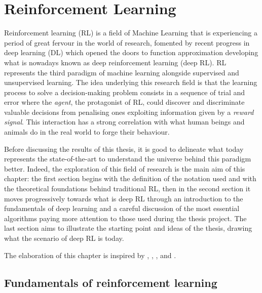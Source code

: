 
\setcounter{chapter}{1}
\chapter{Reinforcement Learning}

Reinforcement learning (RL) is a field of Machine Learning that is experiencing a period of great fervour in the world of research, fomented by recent progress in deep learning (DL) which opened the doors to function approximation developing what is nowadays known as deep reinforcement learning (deep RL).
RL represents the third paradigm of machine learning alongside supervised and unsupervised learning. The idea underlying this research field is that the learning process to solve a decision-making problem consists in a sequence of trial and error where the \textit{agent}, the protagonist of RL, could discover and discriminate valuable decisions from penalising ones exploiting information given by a \textit{reward signal}. This interaction has a strong correlation with what human beings and animals do in the real world to forge their behaviour.


Before discussing the results of this thesis, it is good to delineate what today represents the state-of-the-art to understand the universe behind this paradigm better. Indeed, the exploration of this field of research is the main aim of this chapter: the first section begins with the definition of the notation used and with the theoretical foundations behind traditional RL, then in the second section it moves progressively towards what is deep RL through an introduction to the fundamentals of deep learning and a careful discussion of the most essential algorithms paying more attention to those used during the thesis project.
The last section aims to illustrate the starting point and ideas of the thesis, drawing what the scenario of deep RL is today.


The elaboration of this chapter is inspired by \cite{silver2015lectures}, \cite{sutton2018reinforcement}, \cite{openai2018spinningup}, \cite{lapan2018deep} and \cite{franccois2018introduction}.

\section{Fundamentals of reinforcement learning} \label{fundreinflearn}


